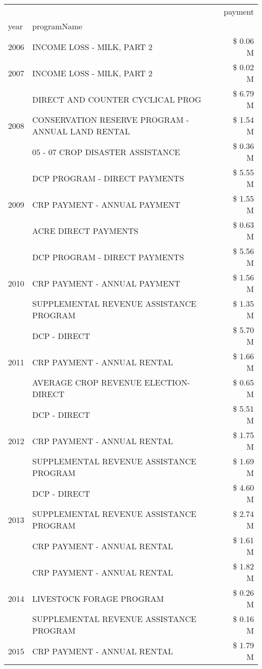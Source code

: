 \begin{tabular}{llr}
\toprule
 &  & payment \\
year & programName &  \\
\midrule
2006 & INCOME LOSS - MILK, PART 2 & \$ 0.06 M \\
\cline{1-3}
2007 & INCOME LOSS - MILK, PART 2 & \$ 0.02 M \\
\cline{1-3}
\multirow[t]{3}{*}{2008} & DIRECT AND COUNTER CYCLICAL PROG & \$ 6.79 M \\
 & CONSERVATION RESERVE PROGRAM - ANNUAL LAND RENTAL & \$ 1.54 M \\
 & 05 - 07 CROP DISASTER ASSISTANCE & \$ 0.36 M \\
\cline{1-3}
\multirow[t]{3}{*}{2009} & DCP PROGRAM - DIRECT PAYMENTS & \$ 5.55 M \\
 & CRP PAYMENT - ANNUAL PAYMENT & \$ 1.55 M \\
 & ACRE DIRECT PAYMENTS & \$ 0.63 M \\
\cline{1-3}
\multirow[t]{3}{*}{2010} & DCP PROGRAM - DIRECT PAYMENTS & \$ 5.56 M \\
 & CRP PAYMENT - ANNUAL PAYMENT & \$ 1.56 M \\
 & SUPPLEMENTAL REVENUE ASSISTANCE PROGRAM & \$ 1.35 M \\
\cline{1-3}
\multirow[t]{3}{*}{2011} & DCP - DIRECT & \$ 5.70 M \\
 & CRP PAYMENT - ANNUAL RENTAL & \$ 1.66 M \\
 & AVERAGE CROP REVENUE ELECTION-DIRECT & \$ 0.65 M \\
\cline{1-3}
\multirow[t]{3}{*}{2012} & DCP - DIRECT & \$ 5.51 M \\
 & CRP PAYMENT - ANNUAL RENTAL & \$ 1.75 M \\
 & SUPPLEMENTAL REVENUE ASSISTANCE PROGRAM & \$ 1.69 M \\
\cline{1-3}
\multirow[t]{3}{*}{2013} & DCP - DIRECT & \$ 4.60 M \\
 & SUPPLEMENTAL REVENUE ASSISTANCE PROGRAM & \$ 2.74 M \\
 & CRP PAYMENT - ANNUAL RENTAL & \$ 1.61 M \\
\cline{1-3}
\multirow[t]{3}{*}{2014} & CRP PAYMENT - ANNUAL RENTAL & \$ 1.82 M \\
 & LIVESTOCK FORAGE PROGRAM & \$ 0.26 M \\
 & SUPPLEMENTAL REVENUE ASSISTANCE PROGRAM & \$ 0.16 M \\
\cline{1-3}
\multirow[t]{3}{*}{2015} & CRP PAYMENT - ANNUAL RENTAL & \$ 1.79 M \\

\end{tabular}
